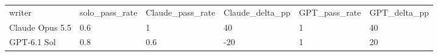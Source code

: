 \begin{tabular}{llllll}
writer & solo\_pass\_rate & Claude\_pass\_rate & Claude\_delta\_pp & GPT\_pass\_rate & GPT\_delta\_pp \\
Claude Opus 5.5 & 0.6 & 1 & 40 & 1 & 40 \\
GPT-6.1 Sol & 0.8 & 0.6 & -20 & 1 & 20 \\
\end{tabular}
